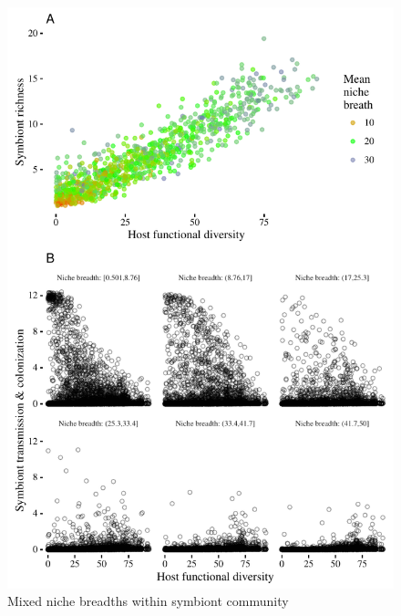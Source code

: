 \documentclass[12pt]{article}
\begin{document}
\begin{figure}
\centering
\includegraphics[width=\textwidth,height=\dimexpr\textheight-4\baselineskip-\abovecaptionskip-\belowcaptionskip\relax,
keepaspectratio]{fig/fig4.pdf}
\caption{Mixed niche breadths within symbiont community}
\label{f5}
\end{figure}

\newpage
\end{document}
